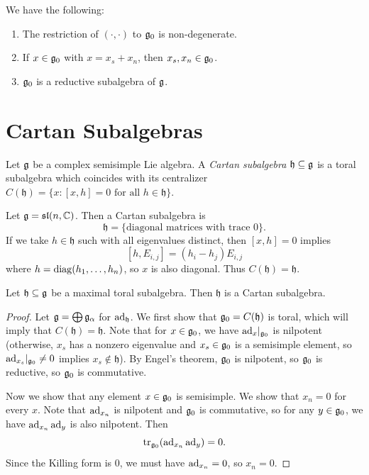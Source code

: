\begin{lemma}
  We have the following:
  \begin{enumerate}
    \item The restriction of
      $(\cdot, \cdot)$ to $\mathfrak{g}_0$ is
      non-degenerate.
    \item If $x \in \mathfrak{g}_0$ with
      $x = x_s + x_n$, then
      $x_s, x_n \in \mathfrak{g}_0$.
    \item $\mathfrak{g}_0$ is a reductive
      subalgebra of $\mathfrak{g}$.
  \end{enumerate}
\end{lemma}

\section{Cartan Subalgebras}

\begin{definition}
  Let $\mathfrak{g}$ be a complex semisimple
  Lie algebra. A \emph{Cartan subalgebra}
  $\mathfrak{h} \subseteq \mathfrak{g}$ is a toral
  subalgebra which coincides with
  its centralizer
  $C(\mathfrak{h}) = \{x : [x, h] = 0 \text{ for all } h \in \mathfrak{h}\}$.
\end{definition}

\begin{example}
  Let $\mathfrak{g} = \mathfrak{sl}(n, \mathbb{C})$. Then a
  Cartan subalgebra is
  \[
    \mathfrak{h} =
    \{\text{diagonal matrices with trace $0$}\}.
  \]
  If we take $h \in \mathfrak{h}$ such
  with all eigenvalues distinct, then
  $[x, h] = 0$ implies
  \[
    [h, E_{i, j}]
    = (h_i - h_j) E_{i, j}
  \]
  where $h = \operatorname{diag}(h_1, \ldots, h_n)$, 
  so $x$ is also diagonal. Thus
  $C(\mathfrak{h}) = \mathfrak{h}$.
\end{example}

\begin{theorem}
  Let $\mathfrak{h} \subseteq \mathfrak{g}$ be a
  maximal toral subalgebra. Then
  $\mathfrak{h}$ is a Cartan subalgebra.
\end{theorem}

\begin{proof}
  Let $\mathfrak{g} = \bigoplus \mathfrak{g}_\alpha$ for
  $\operatorname{ad}_\mathfrak{h}$. We first show that
  $\mathfrak{g}_0 = C(\mathfrak{h})$ is toral, which will
  imply that $C(\mathfrak{h}) = \mathfrak{h}$.
  Note that for $x \in \mathfrak{g}_0$,
  we have ${\operatorname{ad}_x}|_{\mathfrak{g}_0}$ is nilpotent
  (otherwise, $x_s$ has a nonzero eigenvalue
  and $x_s \in \mathfrak{g}_0$ is a semisimple
  element, so ${\operatorname{ad}_{x_s}}|_{\mathfrak{g}_0} \ne 0$
  implies $x_s \notin \mathfrak{h}$).
  By Engel's theorem, $\mathfrak{g}_0$ is
  nilpotent, so $\mathfrak{g}_0$ is
  reductive, so $\mathfrak{g}_0$ is commutative.

  Now we show that any element
  $x \in \mathfrak{g}_0$ is semisimple. We show that
  $x_n = 0$ for every $x$. Note that
  $\operatorname{ad}_{x_n}$ is nilpotent and
  $\mathfrak{g}_0$ is commutative, so for
  any $y \in \mathfrak{g}_0$, we have
  $\operatorname{ad}_{x_n} \operatorname{ad}_y$ is also nilpotent.
  Then
  \[
    \operatorname{tr}_{\mathfrak{g}_0}(\operatorname{ad}_{x_n} \operatorname{ad}_y) = 0.
  \]
  Since the Killing form is
  $0$, we must have $\operatorname{ad}_{x_n} = 0$, so
  $x_n = 0$.
\end{proof}

